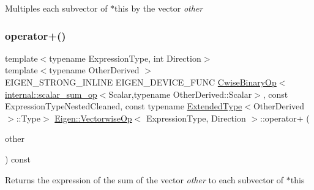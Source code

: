 Multiples each subvector of {\ttfamily $\ast$this} by the vector {\itshape other} \mbox{\label{class_eigen_1_1_vectorwise_op_ad38bb674b896bfc8f96baeb487aa2184}} 
\subsubsection{\texorpdfstring{operator+()}{operator+()}}
{\footnotesize\ttfamily template$<$typename Expression\+Type, int Direction$>$ \\
template$<$typename Other\+Derived $>$ \\
E\+I\+G\+E\+N\+\_\+\+S\+T\+R\+O\+N\+G\+\_\+\+I\+N\+L\+I\+NE E\+I\+G\+E\+N\+\_\+\+D\+E\+V\+I\+C\+E\+\_\+\+F\+U\+NC \mbox{\hyperlink{class_eigen_1_1_cwise_binary_op}{Cwise\+Binary\+Op}}$<$\mbox{\hyperlink{struct_eigen_1_1internal_1_1scalar__sum__op}{internal\+::scalar\+\_\+sum\+\_\+op}}$<$Scalar,typename Other\+Derived\+::\+Scalar$>$, const Expression\+Type\+Nested\+Cleaned, const typename \mbox{\hyperlink{struct_eigen_1_1_vectorwise_op_1_1_extended_type}{Extended\+Type}}$<$Other\+Derived$>$\+::Type$>$ \mbox{\hyperlink{class_eigen_1_1_vectorwise_op}{Eigen\+::\+Vectorwise\+Op}}$<$ Expression\+Type, Direction $>$\+::operator+ (\begin{DoxyParamCaption}\item[{const \mbox{\hyperlink{class_eigen_1_1_dense_base}{Dense\+Base}}$<$ Other\+Derived $>$ \&}]{other }\end{DoxyParamCaption}) const\hspace{0.3cm}{\ttfamily [inline]}}

Returns the expression of the sum of the vector {\itshape other} to each subvector of {\ttfamily $\ast$this} \mbox{\label{class_eigen_1_1_vectorwise_op_ad60d01ea6717f9ef6fd7941cf8b99db7}} 
